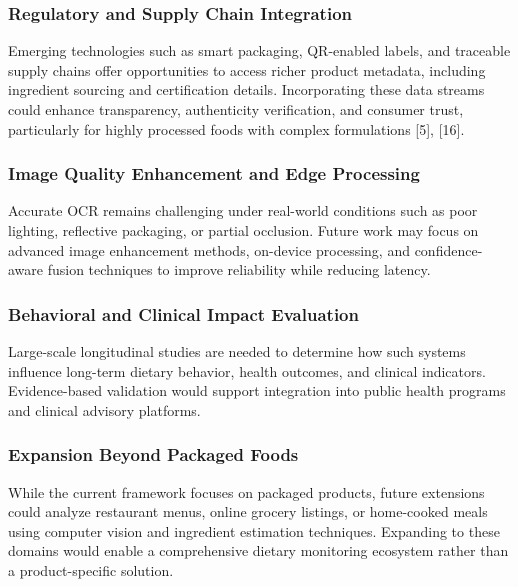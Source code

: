\documentclass[conference]{IEEEtran}
\begin{document}
\subsubsection{Regulatory and Supply Chain Integration}
Emerging technologies such as smart packaging, QR-enabled labels, and traceable supply chains offer opportunities to access richer product metadata, including ingredient sourcing and certification details. Incorporating these data streams could enhance transparency, authenticity verification, and consumer trust, particularly for highly processed foods with complex formulations [5], [16].

\subsubsection{Image Quality Enhancement and Edge Processing}
Accurate OCR remains challenging under real-world conditions such as poor lighting, reflective packaging, or partial occlusion. Future work may focus on advanced image enhancement methods, on-device processing, and confidence-aware fusion techniques to improve reliability while reducing latency.

\subsubsection{Behavioral and Clinical Impact Evaluation}
Large-scale longitudinal studies are needed to determine how such systems influence long-term dietary behavior, health outcomes, and clinical indicators. Evidence-based validation would support integration into public health programs and clinical advisory platforms.

\subsubsection{Expansion Beyond Packaged Foods}
While the current framework focuses on packaged products, future extensions could analyze restaurant menus, online grocery listings, or home-cooked meals using computer vision and ingredient estimation techniques. Expanding to these domains would enable a comprehensive dietary monitoring ecosystem rather than a product-specific solution.
\end{document}
